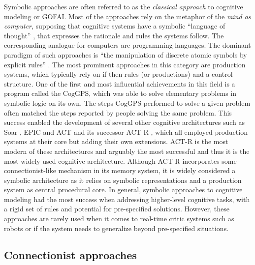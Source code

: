 Symbolic approaches are often referred to as the \emph{classical approach} to cognitive modeling or \acf{GOFAI}.
Most of the approaches rely on the metaphor of the \emph{mind as computer}, supposing that cognitive systems have a symbolic \enquote{language of thought} \parencite{Fodor1975}, that expresses the rationale and rules the systems follow.
The corresponding analogue for computers are programming languages.
The dominant paradigm of such approaches is \enquote{the manipulation of discrete atomic symbols by explicit rules} \parencite{Levy2008}.
The most prominent approaches in this category are production systems, which typically rely on if-then-rules (or productions) and a control structure.
One of the first and most influential achievements in this field is a program called the \ac{CogGPS}, which was able to solve elementary problems in symbolic logic on its own.
The steps \ac{CogGPS} performed to solve a given problem often matched the steps reported by people solving the same problem.
This success enabled the development of several other cognitive architectures such as Soar \parencite{Laird1987}, \ac{EPIC} \parencite{Kieras1997} and \ac{ACT} \parencite{Anderson1983} and its successor \ac{ACT-R} \parencite{Anderson1996}, which all employed production systems at their core but adding their own extensions.
\ac{ACT-R} is the most modern of these architectures and arguably the most successful and thus it is the most widely used cognitive architecture.
Although \ac{ACT-R} incorporates some connectionist-like mechanism in its memory system, it is widely considered a symbolic architecture as it relies on symbolic representations and a production system as central procedural core.
In general, symbolic approaches to cognitive modeling had the most success when addressing higher-level cognitive tasks, with a rigid set of rules and potential for pre-specified solutions.
However, these approaches are rarely used when it comes to real-time critic systems such as robots or if the system needs to generalize beyond pre-specified situations.

\subsection{Connectionist approaches}%
\label{subsec:connectionist_approaches}

